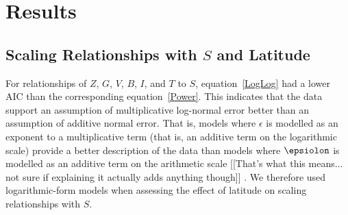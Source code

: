 \documentclass[12pt]{article}
\begin{document}




\section*{Results}

\subsection*{Scaling Relationships with $S$ and Latitude}

For relationships of $Z$, $G$, $V$, $B$, $I$, and $T$ to $S$, equation~\ref{LogLog} had a
lower AIC than the corresponding equation~\ref{Power}. This indicates that the
data support an assumption of multiplicative log-normal error better than an
assumption of additive normal error. That is, models where $\epsilon$ is
modelled as an exponent to a multiplicative term (that is, an additive term on
the logarithmic scale) provide a better description of the data than models
where $\epsiolon$ is modelled as an additive term on the arithmetic scale
[[That's what this means... not sure if explaining it actually adds anything
though]] .  We therefore used logarithmic-form models when assessing the
effect of latitude on scaling relationships  with $S$.
\end{document}
